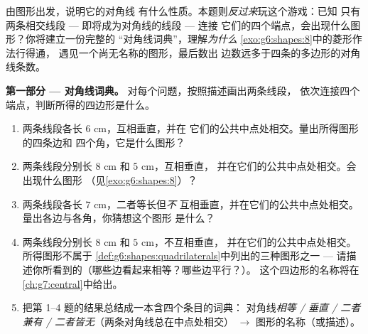\begin{problem}
\label{pb:g6:shapes:1}
由图形出发，说明它的对角线
有什么性质。本题则\emph{反过来}玩这个游戏：已知
只有两条相交线段 --- 即将成为对角线的线段 --- 连接
它们的四个端点，会出现什么图形？你将建立一份完整的
“对角线词典”，理解\emph{为什么}
\cref{exo:g6:shapes:8}中的菱形作法行得通，
遇见一个尚无名称的图形，最后数出
边数远多于四条的多边形的对角线条数。

\medskip
\noindent\textbf{第一部分 --- 对角线词典。}
对每个问题，按照描述画出两条线段，
依次连接四个端点，判断所得的四边形是什么。
\begin{enumerate}
  \item 两条线段各长 $6$ cm，互相垂直，并在
        它们的公共中点处相交。量出所得图形的四条边和
        四个角，它是什么图形？
  \item 两条线段分别长 $8$ cm 和 $5$ cm，互相垂直，
        并在它们的公共中点处相交。会出现什么图形
        （见\cref{exo:g6:shapes:8}）？
  \item 两条线段各长 $7$ cm，二者等长但\emph{不}
        互相垂直，并在它们的公共中点处相交。
        量出各边与各角，你猜想这个图形
        是什么？
  \item 两条线段分别长 $8$ cm 和 $5$ cm，不互相垂直，
        并在它们的公共中点处相交。所得图形不属于
        \cref{def:g6:shapes:quadrilaterals}中列出的三种图形之一 ---
        请描述你所看到的（哪些边看起来相等？哪些边平行？）。
        这个四边形的名称将在
        \cref{ch:g7:central}中给出。
  \item 把第 1--4 题的结果总结成一本含四个条目的词典：
        对角线\emph{相等 / 垂直 / 二者兼有 /
        二者皆无}（两条对角线总在中点处相交）
        $\rightarrow$ 图形的名称（或描述）。
\end{enumerate}


\end{problem}
